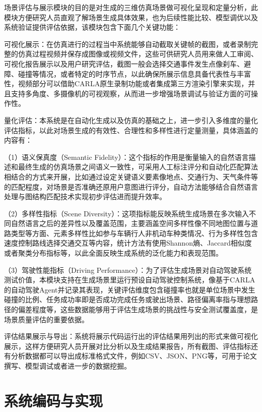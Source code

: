 场景评估与展示模块的目的是对生成的三维仿真场景做可视化呈现和定量分析，此模块方便研究人员直观了解场景生成具体效果，也为后续性能比较、模型调优以及系统验证提供评估依据，该模块包含下面几个关键功能：


可视化展示：在仿真进行的过程当中系统能够自动截取关键帧的截图，或者录制完整的仿真过程视频并保存成图像或视频文件，这些可供研究人员用来做人工审阅、可视化报告展示以及用户研究评估，截图一般会选择交通事件发生点像刹车、避障、碰撞等情况，或者特定的时序节点，以此确保所展示信息具备代表性与丰富性，视频部分可以借助CARLA原生录制功能或者集成第三方渲染引擎来实现，并且支持多角度、多摄像机的可视观察，从而进一步增强场景调试与验证方面的可操作性。

量化评估：本系统是在自动化生成以及仿真的基础之上，进一步引入多维度的量化评估指标，以此对场景生成的有效性、合理性和多样性进行定量测量，具体涵盖的内容有：

（1）语义保真度（Semantic Fidelity）：这个指标的作用是衡量输入的自然语言描述和最终生成的仿真场景之间语义一致性，可采用人工标注评分和自动化匹配算法相结合的方式来开展，比如通过设定关键语义要素像地点、交通行为、天气条件等的匹配程度，对场景是否准确还原用户意图进行评分，自动方法能够结合自然语言处理与图结构匹配技术实现初步评估进而提升效率。


（2）多样性指标（Scene Diversity）：这项指标能反映系统生成场景在多次输入不同自然语言之后的差异性以及覆盖范围，主要涵盖空间多样性像不同地图位置与道路类型等方面、元素多样性比如参与车辆行人非机动车种类情况、行为多样性包含速度控制路线选择交通交互等内容，统计方法有使用Shannon熵、Jaccard相似度或者聚类分布指标等，以此全面反映生成系统的泛化能力和表现范围。

（3）驾驶性能指标（Driving Performance）：为了评估生成场景对自动驾驶系统测试价值，本模块支持在生成场景里运行预设自动驾驶控制系统，像基于CARLA的自动驾驶Agent并记录其表现，关键评估维度包含碰撞率也就是单位场景中发生碰撞的比例、任务成功率即是否成功完成任务或驶出场景、路径偏离率指与理想路径的偏差程度等，这些数据能够用于评估生成场景的挑战性与安全测试覆盖度，是场景质量评估的重要依据。

评估结果展示与导出：系统将展示代码运行出的评估结果用列出的形式来做可视化展示，这样方便研究人员开展对比分析以及生成结果报告，所有截图、评估指标还有分析数据都可以导出成标准格式文件，例如CSV、JSON、PNG等，可用于论文撰写、模型调试或者进一步的数据挖掘。







\section{系统编码与实现}

